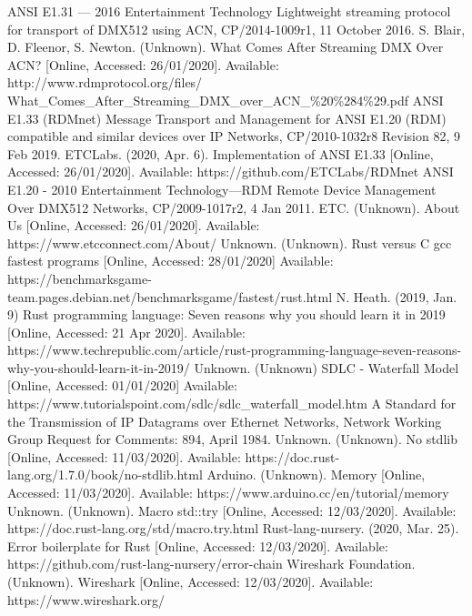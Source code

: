 \documentclass[11pt,a4paper]{article}
\begin{document}
\begin{thebibliography}{20}
	ANSI E1.31 — 2016 Entertainment Technology  Lightweight streaming protocol for transport of DMX512 using ACN, CP/2014-1009r1, 11 October 2016.
	S. Blair, D. Fleenor, S. Newton. (Unknown). What Comes After Streaming DMX Over ACN? [Online, Accessed: 26/01/2020]. Available:	http://www.rdmprotocol.org/files/
	What\_Comes\_After\_Streaming\_DMX\_over\_ACN\_\%20\%284\%29.pdf
	ANSI E1.33 (RDMnet) Message Transport and Management for ANSI E1.20 (RDM) compatible and similar devices over IP Networks, CP/2010-1032r8 Revision 82, 9 Feb 2019.
	ETCLabs. (2020, Apr. 6). Implementation of ANSI E1.33 [Online, Accessed: 26/01/2020]. Available: https://github.com/ETCLabs/RDMnet
	ANSI E1.20 - 2010 Entertainment Technology—RDM Remote Device Management Over DMX512 Networks, CP/2009-1017r2, 4 Jan 2011.
	ETC. (Unknown). About Us [Online, Accessed: 26/01/2020]. Available: https://www.etcconnect.com/About/
	Unknown. (Unknown). Rust versus C gcc fastest programs [Online, Accessed: 28/01/2020] Available: https://benchmarksgame-team.pages.debian.net/benchmarksgame/fastest/rust.html
	N. Heath. (2019, Jan. 9) Rust programming language: Seven reasons why you should learn it in 2019 [Online, Accessed: 21 Apr 2020]. Available: https://www.techrepublic.com/article/rust-programming-language-seven-reasons-why-you-should-learn-it-in-2019/
	Unknown. (Unknown) SDLC - Waterfall Model [Online, Accessed: 01/01/2020] Available: https://www.tutorialspoint.com/sdlc/sdlc\_waterfall\_model.htm
	A Standard for the Transmission of IP Datagrams over Ethernet Networks, Network Working Group Request for Comments: 894, April 1984.
	Unknown. (Unknown). No stdlib [Online, Accessed: 11/03/2020]. Available: https://doc.rust-lang.org/1.7.0/book/no-stdlib.html
	Arduino. (Unknown). Memory [Online, Accessed: 11/03/2020]. Available: 
	https://www.arduino.cc/en/tutorial/memory
	Unknown. (Unknown). Macro std::try [Online, Accessed: 12/03/2020]. Available: https://doc.rust-lang.org/std/macro.try.html
	Rust-lang-nursery. (2020, Mar. 25). Error boilerplate for Rust [Online, Accessed: 12/03/2020]. Available: https://github.com/rust-lang-nursery/error-chain
	Wireshark Foundation. (Unknown). Wireshark [Online, Accessed: 12/03/2020]. Available:
	https://www.wireshark.org/	

\end{thebibliography}
\end{document}
